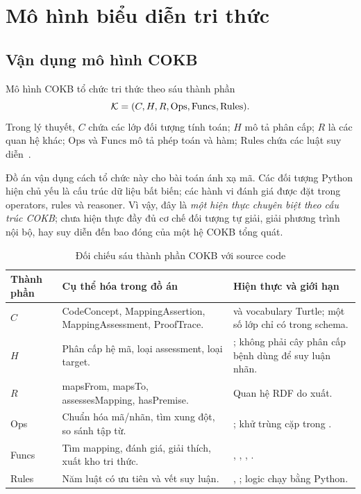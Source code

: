 \chapter{Mô hình biểu diễn tri thức}\label{chap:model}
\section{Vận dụng mô hình COKB}
Mô hình COKB tổ chức tri thức theo sáu thành phần
\begin{equation}
  \mathcal{K}=(C,H,R,\mathrm{Ops},\mathrm{Funcs},\mathrm{Rules}).
  \label{eq:cokb}
\end{equation}
Trong lý thuyết, $C$ chứa các lớp đối tượng tính toán; $H$ mô tả phân cấp;
$R$ là các quan hệ khác; $\mathrm{Ops}$ và $\mathrm{Funcs}$ mô tả phép toán
và hàm; $\mathrm{Rules}$ chứa các luật suy diễn~\cite{do2015}.

Đồ án vận dụng cách tổ chức này cho bài toán ánh xạ mã.
Các đối tượng Python hiện chủ yếu là cấu trúc dữ liệu bất biến; các hành vi
đánh giá được đặt trong operators, rules và reasoner.
Vì vậy, đây là \emph{một hiện thực chuyên biệt theo cấu trúc COKB};
chưa hiện thực đầy đủ cơ chế đối tượng tự giải, giải phương trình nội bộ,
hay suy diễn đến bao đóng của một hệ COKB tổng quát.

\begin{table}[htbp]
\centering\small
\caption{Đối chiếu sáu thành phần COKB với source code}\label{tab:cokb}
\begin{tabularx}{\textwidth}{lYY}
\toprule
Thành phần & Cụ thể hóa trong đồ án & Hiện thực và giới hạn\\
\midrule
$C$ & CodeConcept, MappingAssertion, MappingAssessment, ProofTrace. &
 và vocabulary Turtle; một số lớp chỉ có trong schema.\\
$H$ & Phân cấp hệ mã, loại assessment, loại target. &
; không phải cây phân cấp bệnh dùng để suy luận nhãn.\\
$R$ & mapsFrom, mapsTo, assessesMapping, hasPremise. &
Quan hệ RDF do  xuất.\\
Ops & Chuẩn hóa mã/nhãn, tìm xung đột, so sánh tập từ. &
; khử trùng cặp trong .\\
Funcs & Tìm mapping, đánh giá, giải thích, xuất kho tri thức. &
, , , .\\
Rules & Năm luật có ưu tiên và vết suy luận. &
, ; logic chạy bằng Python.\\
\bottomrule
\end{tabularx}
\end{table}

